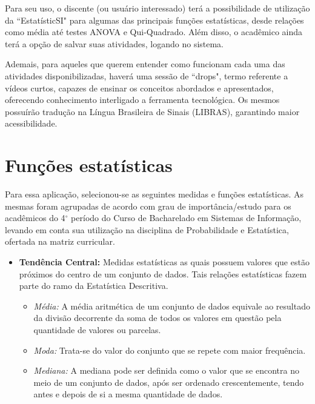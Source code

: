 \documentclass[12pt,a4paper]{article}
\begin{document}
Para seu uso, o discente (ou usuário interessado) terá a possibilidade de utilização da ``EstatísticSI" para algumas das principais funções estatísticas, desde relações como média até testes ANOVA e Qui-Quadrado. Além disso, o acadêmico ainda terá a opção de salvar suas atividades, logando no sistema.
 
Ademais, para aqueles que querem entender como funcionam cada uma das atividades disponibilizadas, haverá uma sessão de ``drops", termo referente a vídeos curtos, capazes de ensinar os conceitos abordados e apresentados, oferecendo conhecimento interligado a ferramenta tecnológica. Os mesmos possuírão tradução na Língua Brasileira de Sinais (LIBRAS), garantindo maior acessibilidade.

\section{Funções estatísticas}

Para essa aplicação, selecionou-se as seguintes medidas e funções estatísticas. As mesmas foram agrupadas de acordo com grau de importância/estudo para os acadêmicos do 4$^{\circ}$ período do Curso de Bacharelado em Sistemas de Informação, levando em conta sua utilização na disciplina de Probabilidade e Estatística, ofertada na matriz curricular.

\begin{itemize}
\item \textbf{Tendência Central:} Medidas estatísticas as quais possuem valores que estão próximos do centro de um conjunto de dados. Tais relações estatísticas fazem parte do ramo da Estatística Descritiva.
	\begin{itemize}
		\item \textit{Média:} A média aritmética de um conjunto de dados equivale ao resultado da divisão decorrente da soma de todos os valores em questão pela quantidade de valores ou parcelas.
		\item \textit{Moda:} Trata-se do valor do conjunto que se repete com maior frequência.
		\item \textit{Mediana:} A mediana pode ser definida como o valor que se encontra no meio de um conjunto de dados, após ser ordenado crescentemente, tendo antes e depois de si a mesma quantidade de dados.
	\end{itemize}
\end{itemize}
\end{document}
